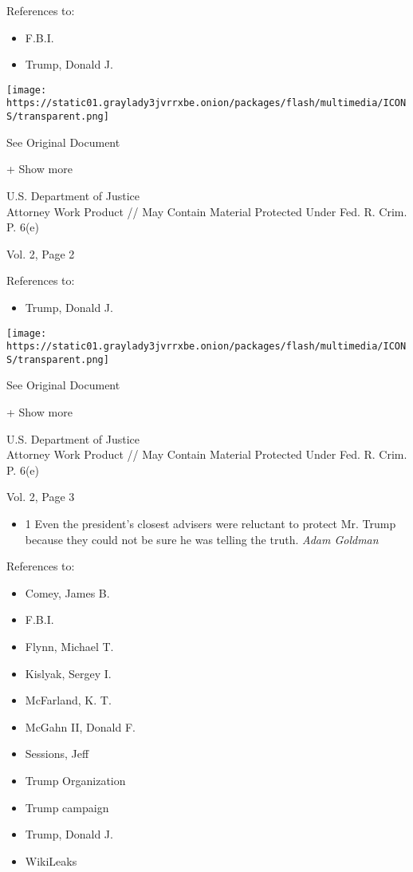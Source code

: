 References to:

\begin{itemize}
\tightlist
\item
  F.B.I.
\item
  Trump, Donald J.
\end{itemize}

\protect\hyperlink{}{}

\texttt{[image: https://static01.graylady3jvrrxbe.onion/packages/flash/multimedia/ICONS/transparent.png]}

See Original Document

+ Show more

U.S. Department of Justice\\
Attorney Work Product // May Contain Material Protected Under Fed. R.
Crim. P. 6(e)

Vol. 2, Page 2

References to:

\begin{itemize}
\tightlist
\item
  Trump, Donald J.
\end{itemize}

\protect\hyperlink{}{}

\texttt{[image: https://static01.graylady3jvrrxbe.onion/packages/flash/multimedia/ICONS/transparent.png]}

See Original Document

+ Show more

U.S. Department of Justice\\
Attorney Work Product // May Contain Material Protected Under Fed. R.
Crim. P. 6(e)

Vol. 2, Page 3

\begin{itemize}
\tightlist
\item
  1 Even the president's closest advisers were reluctant to protect Mr.
  Trump because they could not be sure he was telling the truth.
  \emph{Adam Goldman}
\end{itemize}

References to:

\begin{itemize}
\tightlist
\item
  Comey, James B.
\item
  F.B.I.
\item
  Flynn, Michael T.
\item
  Kislyak, Sergey I.
\item
  McFarland, K. T.
\item
  McGahn II, Donald F.
\item
  Sessions, Jeff
\item
  Trump Organization
\item
  Trump campaign
\item
  Trump, Donald J.
\item
  WikiLeaks
\end{itemize}

